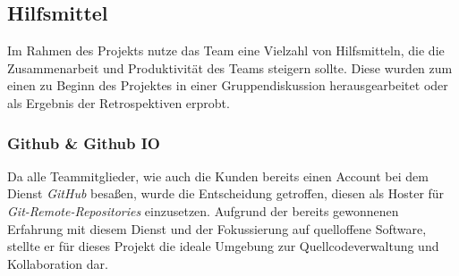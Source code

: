 \documentclass[10pt, a4paper]{article}
\begin{document}
\begin{onehalfspace}
  \subsection{Hilfsmittel}
      Im Rahmen des Projekts nutze das Team eine Vielzahl von Hilfsmitteln, die die Zusammenarbeit und Produktivität des Teams steigern sollte.
      Diese wurden zum einen zu Beginn des Projektes in einer Gruppendiskussion herausgearbeitet oder als Ergebnis der Retrospektiven erprobt.

      \subsubsection{Github \& Github IO}
      Da alle Teammitglieder, wie auch die Kunden bereits einen Account bei dem Dienst \textit{GitHub} besaßen, wurde die Entscheidung getroffen, diesen als Hoster für \textit{Git-Remote-Repositories} einzusetzen.
      Aufgrund der bereits gewonnenen Erfahrung mit diesem Dienst und der Fokussierung auf quelloffene Software, stellte er für dieses Projekt die ideale Umgebung zur Quellcodeverwaltung und Kollaboration dar.


\end{onehalfspace}
\end{document}

